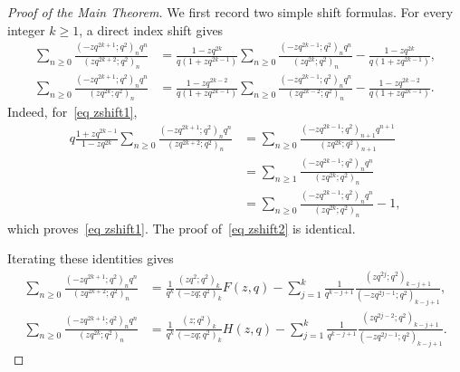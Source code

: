 \documentclass[10pt,a4paper]{amsart}
\numberwithin{equation}{section}
\begin{document}
\begin{proof}[Proof of the Main Theorem]
We first record two simple shift formulas. For every integer $k\ge 1$, a direct index shift gives
\begin{align}
\sum_{n\ge 0}\frac{(-zq^{2k+1};q^2)_n q^n}{(zq^{2k+2};q^2)_n}
&=\frac{1-zq^{2k}}{q(1+zq^{2k-1})}
\sum_{n\ge 0}\frac{(-zq^{2k-1};q^2)_n q^n}{(zq^{2k};q^2)_n}
-\frac{1-zq^{2k}}{q(1+zq^{2k-1})}, \label{eq zshift1}\\
\sum_{n\ge 0}\frac{(-zq^{2k+1};q^2)_n q^n}{(zq^{2k};q^2)_n}
&=\frac{1-zq^{2k-2}}{q(1+zq^{2k-1})}
\sum_{n\ge 0}\frac{(-zq^{2k-1};q^2)_n q^n}{(zq^{2k-2};q^2)_n}
-\frac{1-zq^{2k-2}}{q(1+zq^{2k-1})}. \label{eq zshift2}
\end{align}
Indeed, for~\eqref{eq zshift1},
\begin{align*}
q\frac{1+zq^{2k-1}}{1-zq^{2k}}
\sum_{n\ge 0}\frac{(-zq^{2k+1};q^2)_n q^n}{(zq^{2k+2};q^2)_n}
&=\sum_{n\ge 0}\frac{(-zq^{2k-1};q^2)_{n+1} q^{n+1}}{(zq^{2k};q^2)_{n+1}}\\
&=\sum_{n\ge 1}\frac{(-zq^{2k-1};q^2)_n q^n}{(zq^{2k};q^2)_n}\\
&=\sum_{n\ge 0}\frac{(-zq^{2k-1};q^2)_n q^n}{(zq^{2k};q^2)_n}-1,
\end{align*}
which proves~\eqref{eq zshift1}. The proof of~\eqref{eq zshift2} is identical.

Iterating these identities gives
\begin{align}
\sum_{n\ge 0}\frac{(-zq^{2k+1};q^2)_n q^n}{(zq^{2k+2};q^2)_n}
&=\frac{1}{q^k}\frac{(zq^2;q^2)_k}{(-zq;q^2)_k}F(z,q)
-\sum_{j=1}^k\frac{1}{q^{k-j+1}}
\frac{(zq^{2j};q^2)_{k-j+1}}{(-zq^{2j-1};q^2)_{k-j+1}}, \label{eq ziterate1}\\
\sum_{n\ge 0}\frac{(-zq^{2k+1};q^2)_n q^n}{(zq^{2k};q^2)_n}
&=\frac{1}{q^k}\frac{(z;q^2)_k}{(-zq;q^2)_k}H(z,q)
-\sum_{j=1}^k\frac{1}{q^{k-j+1}}
\frac{(zq^{2j-2};q^2)_{k-j+1}}{(-zq^{2j-1};q^2)_{k-j+1}}. \label{eq ziterate2}
\end{align}


\end{proof}
\end{document}
